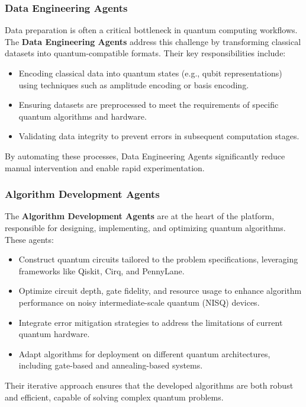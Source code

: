\documentclass[12pt]{article}
\begin{document}
\subsubsection{Data Engineering Agents}
Data preparation is often a critical bottleneck in quantum computing workflows. The \textbf{Data Engineering Agents} address this challenge by transforming classical datasets into quantum-compatible formats. Their key responsibilities include:
\begin{itemize}
    \item Encoding classical data into quantum states (e.g., qubit representations) using techniques such as amplitude encoding or basis encoding.
    \item Ensuring datasets are preprocessed to meet the requirements of specific quantum algorithms and hardware.
    \item Validating data integrity to prevent errors in subsequent computation stages.
\end{itemize}
By automating these processes, Data Engineering Agents significantly reduce manual intervention and enable rapid experimentation.

\subsubsection{Algorithm Development Agents}
The \textbf{Algorithm Development Agents} are at the heart of the platform, responsible for designing, implementing, and optimizing quantum algorithms. These agents:
\begin{itemize}
    \item Construct quantum circuits tailored to the problem specifications, leveraging frameworks like Qiskit, Cirq, and PennyLane.
    \item Optimize circuit depth, gate fidelity, and resource usage to enhance algorithm performance on noisy intermediate-scale quantum (NISQ) devices.
    \item Integrate error mitigation strategies to address the limitations of current quantum hardware.
    \item Adapt algorithms for deployment on different quantum architectures, including gate-based and annealing-based systems.
\end{itemize}
Their iterative approach ensures that the developed algorithms are both robust and efficient, capable of solving complex quantum problems.
\end{document}
